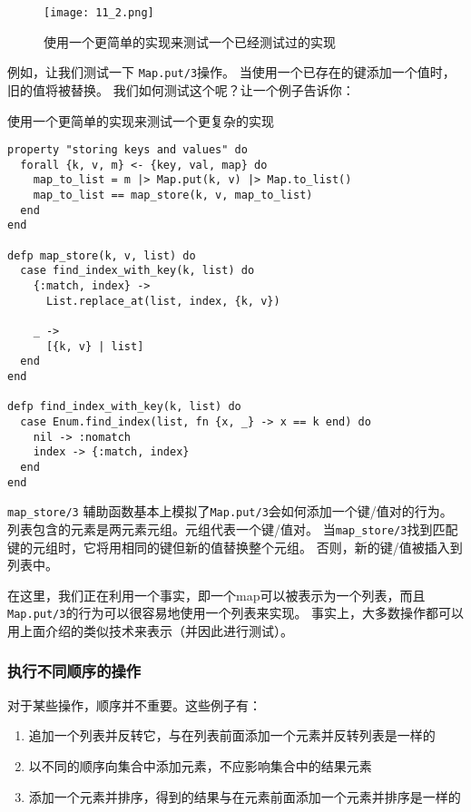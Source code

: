 \begin{figure}[!ht]
    \centering
    \texttt{[image: 11\_2.png]}
    \caption{使用一个更简单的实现来测试一个已经测试过的实现}
    \label{fig:11_2}
\end{figure}


例如，让我们测试一下 \texttt{Map.put/3}操作。
当使用一个已存在的键添加一个值时，旧的值将被替换。
我们如何测试这个呢？让一个例子告诉你：

\begin{code}{使用一个更简单的实现来测试一个更复杂的实现}
\begin{verbatim}
property "storing keys and values" do
  forall {k, v, m} <- {key, val, map} do
    map_to_list = m |> Map.put(k, v) |> Map.to_list()
    map_to_list == map_store(k, v, map_to_list)
  end
end

defp map_store(k, v, list) do
  case find_index_with_key(k, list) do
    {:match, index} ->
      List.replace_at(list, index, {k, v})

    _ ->
      [{k, v} | list]
  end
end

defp find_index_with_key(k, list) do
  case Enum.find_index(list, fn {x, _} -> x == k end) do
    nil -> :nomatch
    index -> {:match, index}
  end
end
\end{verbatim}
\label{lst:using_a_simpler_implementation_to_test_a_more_complex_one}
\end{code}

\texttt{map\_store/3} 辅助函数基本上模拟了\texttt{Map.put/3}会如何添加一个键/值对的行为。
列表包含的元素是两元素元组。元组代表一个键/值对。
当\texttt{map\_store/3}找到匹配键的元组时，它将用相同的键但新的值替换整个元组。
否则，新的键/值被插入到列表中。

在这里，我们正在利用一个事实，即一个map可以被表示为一个列表，而且\texttt{Map.put/3}的行为可以很容易地使用一个列表来实现。
事实上，大多数操作都可以用上面介绍的类似技术来表示（并因此进行测试）。

\subsubsection{执行不同顺序的操作}

对于某些操作，顺序并不重要。这些例子有：
\begin{enumerate}
\item  追加一个列表并反转它，与在列表前面添加一个元素并反转列表是一样的
\item  以不同的顺序向集合中添加元素，不应影响集合中的结果元素
\item 添加一个元素并排序，得到的结果与在元素前面添加一个元素并排序是一样的
\end{enumerate}

